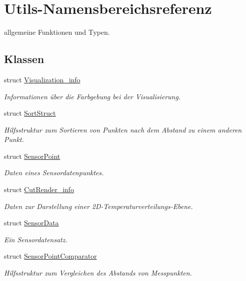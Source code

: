 \hypertarget{namespaceUtils}{\section{Utils-\/\-Namensbereichsreferenz}
\label{namespaceUtils}
}


allgemeine Funktionen und Typen.  


\subsection*{Klassen}
\begin{DoxyCompactItemize}
\item 
struct \hyperlink{structUtils_1_1Visualization__info}{Visualization\-\_\-info}
\begin{DoxyCompactList}\small\item\em Informationen über die Farbgebung bei der Visualisierung. \end{DoxyCompactList}\item 
struct \hyperlink{structUtils_1_1SortStruct}{Sort\-Struct}
\begin{DoxyCompactList}\small\item\em Hilfsstruktur zum Sortieren von Punkten nach dem Abstand zu einem anderen Punkt. \end{DoxyCompactList}\item 
struct \hyperlink{structUtils_1_1SensorPoint}{Sensor\-Point}
\begin{DoxyCompactList}\small\item\em Daten eines Sensordatenpunktes. \end{DoxyCompactList}\item 
struct \hyperlink{structUtils_1_1CutRender__info}{Cut\-Render\-\_\-info}
\begin{DoxyCompactList}\small\item\em Daten zur Darstellung einer 2\-D-\/\-Temperaturverteilungs-\/\-Ebene. \end{DoxyCompactList}\item 
struct \hyperlink{structUtils_1_1SensorData}{Sensor\-Data}
\begin{DoxyCompactList}\small\item\em Ein Sensordatensatz. \end{DoxyCompactList}\item 
struct \hyperlink{structUtils_1_1SensorPointComparator}{Sensor\-Point\-Comparator}
\begin{DoxyCompactList}\small\item\em Hilfsstruktur zum Vergleichen des Abstands von Messpunkten. \end{DoxyCompactList}\end{DoxyCompactItemize}
